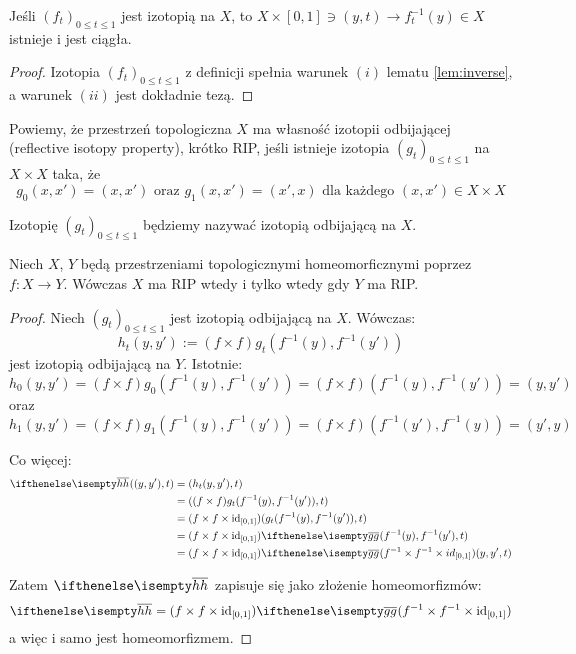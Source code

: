 \begin{cor} \label{cor:isotopy-inverse}
  Jeśli $(f_t)_{0 \leq t \leq 1}$ jest izotopią na $X$, to $X \times [0,1] \ni (y, t) \rightarrow f_t^{-1}(y) \in X$ istnieje i jest ciągła.
  \begin{proof}
    Izotopia $(f_t)_{0 \leq t \leq 1}$ z definicji spełnia warunek $(i)$ lematu \ref{lem:inverse}, a warunek $(ii)$ jest dokładnie tezą.
  \end{proof}
\end{cor}

\begin{df}
  Powiemy, że przestrzeń topologiczna $X$ ma własność izotopii odbijającej (reflective isotopy property), krótko RIP, jeśli istnieje izotopia $(g_t)_{0 \leq t \leq 1}$ na $X \times X$ taka, że
  \[g_0(x, x') = (x, x') \mbox{ oraz } g_1(x, x') = (x', x) \mbox{ dla każdego } (x, x') \in X \times X\]
  
  Izotopię $(g_t)_{0 \leq t \leq 1}$ będziemy nazywać izotopią odbijającą na $X$.
\end{df}

\begin{ex}
  Niech $X$, $Y$ będą przestrzeniami topologicznymi homeomorficznymi poprzez $f: X \rightarrow Y$. Wówczas $X$ ma RIP wtedy i tylko wtedy gdy $Y$ ma RIP.
  \begin{proof}
    Niech $(g_t)_{0 \leq t \leq 1}$ jest izotopią odbijającą na $X$. Wówczas:
    \[h_t(y, y') := (f \times f) g_t(f^{-1}(y), f^{-1}(y'))\]
    jest izotopią odbijającą na $Y$. Istotnie:
    \[h_0(y,y') = (f \times f) g_0(f^{-1}(y), f^{-1}(y')) = (f \times f)(f^{-1}(y), f^{-1}(y')) = (y, y')\]
    oraz
    \[h_1(y,y') = (f \times f) g_1(f^{-1}(y), f^{-1}(y')) = (f \times f)(f^{-1}(y'), f^{-1}(y)) = (y', y)\]
    
    Co więcej:
    \begin{align*}
      \cl{h}((y, y'), t) & = (h_t(y,y'), t) \\
      & = ((f \times f)g_t(f^{-1}(y), f^{-1}(y')), t) \\
      & = (f \times f \times \id_{[0,1]}) (g_t(f^{-1}(y), f^{-1}(y')), t) \\
      & = (f \times f \times \id_{[0,1]}) \cl{g} (f^{-1}(y), f^{-1}(y'), t) \\
      & = (f \times f \times \id_{[0,1]}) \cl{g} (f^{-1} \times f^{-1} \times id_{[0,1]})(y, y', t) 
    \end{align*}
    
    Zatem $\cl{h}$ zapisuje się jako złożenie homeomorfizmów:
    \[\cl{h} = (f \times f \times \id_{[0,1]}) \cl{g} (f^{-1} \times f^{-1} \times \id_{[0,1]})\]
    a więc i samo jest homeomorfizmem.
  \end{proof}
\end{ex}

